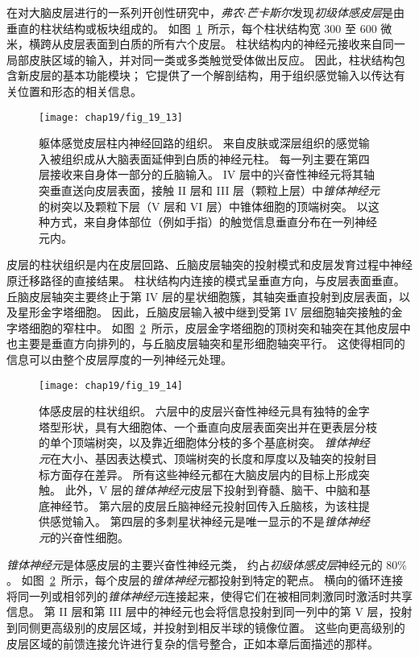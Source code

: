 在对大脑皮层进行的一系列开创性研究中，\textit{弗农$\cdot$芒卡斯尔}发现\textit{初级体感皮层}是由垂直的柱状结构或板块组成的。
如图~\ref{fig:19_13}~所示，每个柱状结构宽 300 至 600 微米，横跨从皮层表面到白质的所有六个皮层。
柱状结构内的神经元接收来自同一局部皮肤区域的输入，并对同一类或多类触觉受体做出反应。
因此，柱状结构包含新皮层的基本功能模块；
它提供了一个解剖结构，用于组织感觉输入以传达有关位置和形态的相关信息。


\begin{figure}[htbp]
	\centering
	\texttt{[image: chap19/fig\_19\_13]}
	\caption{躯体感觉皮层柱内神经回路的组织。
		来自皮肤或深层组织的感觉输入被组织成从大脑表面延伸到白质的神经元柱。
		每一列主要在第四层接收来自身体一部分的丘脑输入。
		IV 层中的兴奋性神经元将其轴突垂直送向皮层表面，接触 II 层和 III 层（颗粒上层）中\textit{锥体神经元}的树突以及颗粒下层（V 层和 VI 层）中锥体细胞的顶端树突。
		以这种方式，来自身体部位（例如手指）的触觉信息垂直分布在一列神经元内。}
	\label{fig:19_13}
\end{figure}


皮层的柱状组织是内在皮层回路、丘脑皮层轴突的投射模式和皮层发育过程中神经原迁移路径的直接结果。
柱状结构内连接的模式呈垂直方向，与皮层表面垂直。
丘脑皮层轴突主要终止于第 IV 层的星状细胞簇，其轴突垂直投射到皮层表面，以及星形金字塔细胞。
因此，丘脑皮层输入被中继到受第 IV 层细胞轴突接触的金字塔细胞的窄柱中。
如图~\ref{fig:19_14}~所示，皮层金字塔细胞的顶树突和轴突在其他皮层中也主要是垂直方向排列的，与丘脑皮层轴突和星形细胞轴突平行。
这使得相同的信息可以由整个皮层厚度的一列神经元处理。


\begin{figure}[htbp]
	\centering
	\texttt{[image: chap19/fig\_19\_14]}
	\caption{体感皮层的柱状组织。
		六层中的皮层兴奋性神经元具有独特的金字塔型形状，具有大细胞体、一个垂直向皮层表面突出并在更表层分枝的单个顶端树突，以及靠近细胞体分枝的多个基底树突。
		\textit{锥体神经元}在大小、基因表达模式、顶端树突的长度和厚度以及轴突的投射目标方面存在差异。
		所有这些神经元都在大脑皮层内的目标上形成突触。
		此外，V 层的\textit{锥体神经元}皮层下投射到脊髓、脑干、中脑和基底神经节。
		第六层的皮层丘脑神经元投射回传入丘脑核，为该柱提供感觉输入。
		第四层的多刺星状神经元是唯一显示的不是\textit{锥体神经元}的兴奋性细胞\cite{oberlaender2012cell}。}
	\label{fig:19_14}
\end{figure}


\textit{锥体神经元}是体感皮层的主要兴奋性神经元类，
约占\textit{初级体感皮层}神经元的 80\% 。 
如图~\ref{fig:19_14}~所示，每个皮层的\textit{锥体神经元}都投射到特定的靶点。
横向的循环连接将同一列或相邻列的\textit{锥体神经元}连接起来，使得它们在被相同刺激同时激活时共享信息。
第 II 层和第 III 层中的神经元也会将信息投射到同一列中的第 V 层，投射到同侧更高级别的皮层区域，并投射到相反半球的镜像位置。
这些向更高级别的皮层区域的前馈连接允许进行复杂的信号整合，正如本章后面描述的那样。


